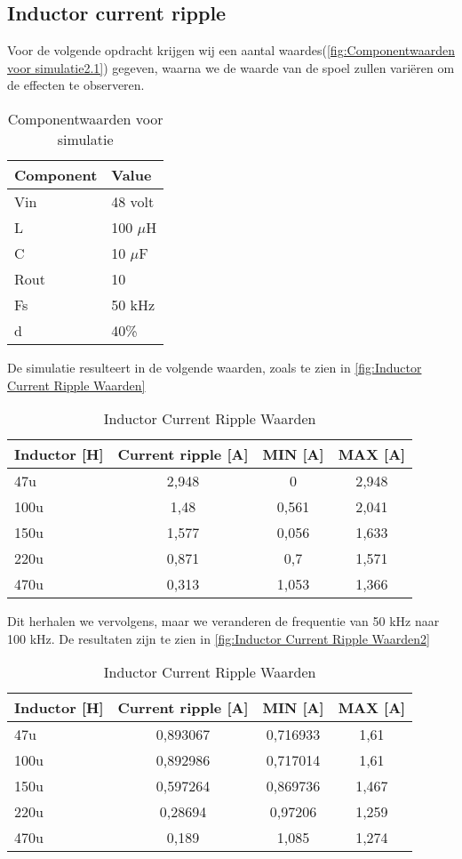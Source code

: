 \subsection{Inductor current ripple}
Voor de volgende opdracht krijgen wij een aantal waardes(\autoref{fig:Componentwaarden voor simulatie2.1}) gegeven, waarna we de waarde van de spoel zullen variëren om de effecten te observeren.
\begin{table}[h!]
\centering
\begin{tabular}{|l|l|}
\hline
\textbf{Component} & \textbf{Value} \\
\hline
Vin  & 48 volt \\
L    & 100 $\mu$H \\
C    & 10 $\mu$F \\
Rout & 10 \\
Fs   & 50 kHz \\
d    & 40\% \\
\hline
\end{tabular}
\caption{Componentwaarden voor simulatie}
\label{fig:Componentwaarden voor simulatie2.1}
\end{table}
De simulatie resulteert in de volgende waarden, zoals te zien in \autoref{fig:Inductor Current Ripple Waarden}
\begin{table}[h!]
\centering
\begin{tabular}{|l|c|c|c|}
\hline
\textbf{Inductor [H]} & \textbf{Current ripple [A]} & \textbf{MIN [A]} & \textbf{MAX [A]} \\
\hline
47u  & 2,948  & 0     & 2,948 \\
100u & 1,48   & 0,561 & 2,041 \\
150u & 1,577  & 0,056 & 1,633 \\
220u & 0,871  & 0,7   & 1,571 \\
470u & 0,313  & 1,053 & 1,366 \\
\hline
\end{tabular}
\caption{Inductor Current Ripple Waarden}
\label{fig:Inductor Current Ripple Waarden}
\end{table}
Dit herhalen we vervolgens, maar we veranderen de frequentie van 50 kHz naar 100 kHz. De resultaten zijn te zien in \autoref{fig:Inductor Current Ripple Waarden2}
\begin{table}[h!]
\centering
\begin{tabular}{|l|c|c|c|}
\hline
\textbf{Inductor [H]} & \textbf{Current ripple [A]} & \textbf{MIN [A]} & \textbf{MAX [A]}\\
\hline
47u  & 0,893067  & 0,716933  & 1,61 \\
100u & 0,892986  & 0,717014  & 1,61 \\
150u & 0,597264  & 0,869736  & 1,467 \\
220u & 0,28694   & 0,97206   & 1,259 \\
470u & 0,189     & 1,085     & 1,274 \\
\hline
\end{tabular}
\caption{Inductor Current Ripple Waarden}
\label{fig:Inductor Current Ripple Waarden2}
\end{table}